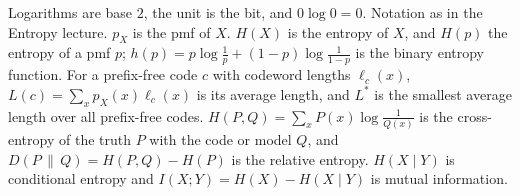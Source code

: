 \providecommand{\Var}{\operatorname{Var}}
\providecommand{\up}{\textsf{up}}
\providecommand{\down}{\textsf{down}}
\providecommand{\lft}{\textsf{left}}
\providecommand{\rgt}{\textsf{right}}

\noindent Logarithms are base $2$, the unit is the bit, and $0\log0=0$. Notation as in the Entropy lecture. $p_X$ is the pmf of $X$. $H(X)$ is the entropy of $X$, and $H(p)$ the entropy of a pmf $p$; $h(p)=p\log\frac1p+(1-p)\log\frac1{1-p}$ is the binary entropy function. For a prefix-free code $c$ with codeword lengths $\ell_c(x)$, $L(c)=\sum_xp_X(x)\ell_c(x)$ is its average length, and $L^*$ is the smallest average length over all prefix-free codes. $H(P,Q)=\sum_xP(x)\log\frac1{Q(x)}$ is the cross-entropy of the truth $P$ with the code or model $Q$, and $D(P\,\|\,Q)=H(P,Q)-H(P)$ is the relative entropy. $H(X\mid Y)$ is conditional entropy and $I(X;Y)=H(X)-H(X\mid Y)$ is mutual information.

